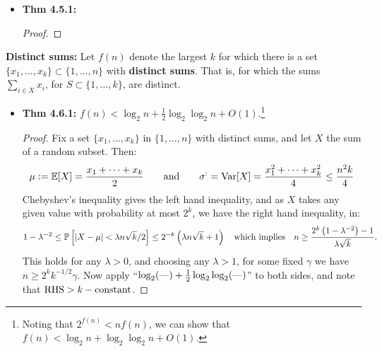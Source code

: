 \documentclass[11pt]{article}
\newenvironment{INT}[1][]{\begin{itemize}\small\item\textbf{#1}}{\end{itemize}}
\begin{document}
\begin{chapter4}
\begin{itemise}
\begin{INT}[Thm 4.5.1:]
\begin{proof}
\end{proof}
\end{INT}
\item \textbf{Distinct sums:} Let $f(n)$ denote the largest $k$ for which there is a set $\{x_1,\ldots,x_k\}\subset\{1,\ldots,n\}$ with \textbf{distinct sums}. That is, for which the sums $\sum_{i\in X}x_i$, for $S\subset\{1,\ldots,k\}$, are distinct.
\begin{INT}[Thm 4.6.1:]
$f(n)<\log_2n+\frac{1}{2}\log_2\log_2n+O(1)$.\footnote{Noting that $2^{f(n)}<nf(n)$, we can show that $f(n)<\log_2n+\log_2\log_2n+O(1)$.}
\begin{proof}
Fix a set $\{x_1,\ldots,x_k\}$ in $\{1,\ldots,n\}$ with distinct sums, and let $X$ the sum of a random subset. Then:
\[\mu:=\operatorname{\mathbb{E}}[X]=\frac{x_1+\cdots+x_k}{2}\textup{\qquad and\qquad}\sigma^:=\operatorname{Var}[X]=\frac{x_1^2+\cdots+x_k^2}{4}\leq\frac{n^2k}{4}\]
Chebyshev's inequality gives the left hand inequality, and as $X$ takes any given value with probability at most $2^k$, we have the right hand inequality, in:
\[1-\lambda^{-2}\leq
\operatorname{\mathbb{P}}\left[|X-\mu|<\lambda n\sqrt{k}/2\right]\leq
2^{-k}\left(\lambda n\sqrt{k}+1\right)\textup{\quad which implies\quad }
n\geq\frac{2^k\left(1-\lambda^{-2}\right)-1}{\lambda\sqrt k}.\]
This holds for any $\lambda>0$, and choosing any $\lambda>1$, for some fixed $\gamma$ we have $n\geq 2^kk^{-1/2}\gamma$. Now apply ``$\log_2(\textup{---})+\frac{1}{2}\log_2\log_2(\textup{---})$'' to both sides, and note that $\textup{RHS}>k-\textup{constant}$.
\end{proof}

\end{INT}
\end{itemise}

\end{chapter4}
\end{document}
